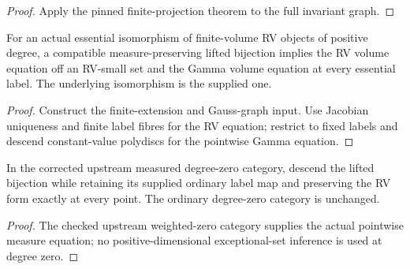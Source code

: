 \begin{proof}

\leanok

Apply the pinned finite-projection theorem to the full invariant graph.

\end{proof}

\begin{corollary}

\label{s2-volume}


\leanok

For an actual essential isomorphism of finite-volume RV objects of positive degree, a compatible measure-preserving lifted bijection implies the RV volume equation off an RV-small set and the Gamma volume equation at every essential label. The underlying isomorphism is the supplied one.

\end{corollary}

\begin{proof}


\leanok

Construct the finite-extension and Gauss-graph input. Use Jacobian uniqueness and finite label fibres for the RV equation; restrict to fixed labels and descend constant-value polydiscs for the pointwise Gamma equation.

\end{proof}

\begin{corollary}

\label{s2-zero}


\leanok

In the corrected upstream measured degree-zero category, descend the lifted bijection while retaining its supplied ordinary label map and preserving the RV form exactly at every point. The ordinary degree-zero category is unchanged.

\end{corollary}

\begin{proof}


\leanok

The checked upstream weighted-zero category supplies the actual pointwise measure equation; no positive-dimensional exceptional-set inference is used at degree zero.

\end{proof}

